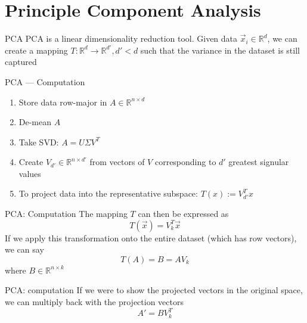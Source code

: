 
	\section{Principle Component Analysis}

	\begin{frame}{PCA}
	PCA is a linear dimensionality reduction tool. Given data $\vec{x}_i \in \mathbb{R}^d$, we can create a mapping $T : \mathbb{R}^d \rightarrow \mathbb{R}^{d'}, d' < d$ such that the variance in the dataset is still captured
	\end{frame}

	\begin{frame}{PCA --- Computation}
		\begin{enumerate}[<+->]
			\item Store data row-major in $A \in \mathbb{R}^{n \times d}$
			\item De-mean $A$
			\item Take SVD: $A = U \Sigma V^T$
			\item Create $V_{d'} \in \mathbb{R}^{n \times d'}$ from vectors of $V$ corresponding to $d'$ greatest signular values
			\item To project data into the representative subspace: $T(x) := V_{d'}^T x$
		\end{enumerate}
	\end{frame}

	\begin{frame}{PCA: Computation}
	The mapping $T$ can then be expressed as
	\[ T(\vec{x}) = V_k^T \vec{x} \]
	If we apply this transformation onto the entire dataset (which has row vectors), we can say
	\[ T(A) = B = A V_k \]
	where $B \in \mathbb{R}^{n \times k}$
	\end{frame}
	\begin{frame}{PCA: computation}
	If we were to show the projected vectors in the original space, we can multiply back with the projection vectors
	\[ A' = B V_k^T \]
	\end{frame}

